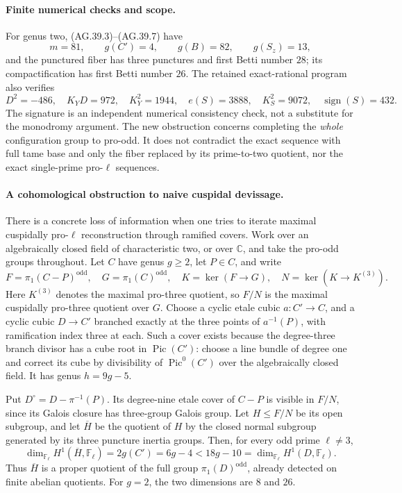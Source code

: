 \paragraph{Finite numerical checks and scope.}
For genus two, (AG.39.3)--(AG.39.7) have
\[
 m=81,\qquad g(C')=4,\qquad g(B)=82,
 \qquad g(S_z)=13,
\]
and the punctured fiber has three punctures and first Betti
number \(28\); its compactification has first Betti number
\(26\). The retained exact-rational program
 also verifies
\[
 D^2=-486,\quad K_YD=972,\quad K_Y^2=1944,
 \quad e(S)=3888,\quad K_S^2=9072,\quad
 \operatorname{sign}(S)=432.
                                                               \tag{AG.39.10}
\]
The signature is an independent numerical consistency check,
not a substitute for the monodromy argument. The new obstruction
concerns completing the \emph{whole} configuration group to
pro-odd. It does not contradict the exact sequence with full
tame base and only the fiber replaced by its prime-to-two
quotient, nor the exact single-prime pro-\(\ell\) sequences.

\paragraph{A cohomological obstruction to naive cuspidal devissage.}
There is a concrete loss of information when one tries to
iterate maximal cuspidally pro-\(\ell\) reconstruction through
ramified covers. Work over an algebraically closed field of
characteristic two, or over \(\mathbb C\), and take the
pro-odd groups throughout. Let \(C\) have genus \(g\geq2\),
let \(P\in C\), and write
\[
 F=\pi_1(C-P)^{\mathrm{odd}},\quad
 G=\pi_1(C)^{\mathrm{odd}},\quad K=\ker(F\to G),
 \quad N=\ker(K\to K^{(3)}).
\]
Here \(K^{(3)}\) denotes the maximal pro-three quotient,
so \(F/N\) is the maximal cuspidally pro-three quotient over
\(G\). Choose a cyclic etale cubic \(a:C'\to C\), and a
cyclic cubic \(D\to C'\) branched exactly at the three
points of \(a^{-1}(P)\), with ramification index three at
each. Such a cover exists because the degree-three branch
divisor has a cube root in \(\operatorname{Pic}(C')\):
choose a line bundle of degree one and correct its cube
by divisibility of \(\operatorname{Pic}^0(C')\) over the
algebraically closed field.
It has genus \(h=9g-5\).

Put \(D^\circ=D-\pi^{-1}(P)\). Its degree-nine etale cover
of \(C-P\) is visible in \(F/N\), since its Galois closure
has three-group Galois group. Let \(H\leq F/N\) be its
open subgroup, and let \(\overline H\) be the quotient of
\(H\) by the closed normal subgroup generated by its three
puncture inertia groups. Then, for every odd prime
\(\ell\ne3\),
\[
 \dim_{\mathbb F_\ell}H^1(\overline H,\mathbb F_\ell)
       =2g(C')=6g-4
       <18g-10
       =\dim_{\mathbb F_\ell}H^1(D,\mathbb F_\ell).
                                                               \tag{AG.39.11}
\]
Thus \(\overline H\) is a proper quotient of the full
group \(\pi_1(D)^{\mathrm{odd}}\), already detected on
finite abelian quotients. For \(g=2\), the two dimensions
are \(8\) and \(26\).

